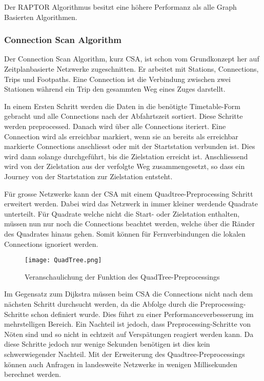 Der RAPTOR Algorithmus besitzt eine höhere Performanz als alle Graph Basierten Algorithmen. ~\cite{raptor}

\subsubsection{Connection Scan Algorithm}
\label{sec:Connection Scan Algorithm}
Der Connection Scan Algorithm, kurz CSA, ist schon vom Grundkonzept her auf Zeitplanbasierte Netzwerke zugeschnitten. Er arbeitet mit Stations, Connections, Trips und Footpaths. Eine Connection ist die Verbindung zwischen zwei Stationen während ein Trip den gesammten Weg eines Zuges darstellt. 

In einem Ersten Schritt werden die Daten in die benötigte Timetable-Form gebracht und alle Connections nach der Abfahrtszeit sortiert. Diese Schritte werden preprocessed. Danach wird über alle Connections iteriert. Eine Connection wird als erreichbar markiert, wenn sie an bereits als erreichbar markierte Connections anschliesst oder mit der Startstation verbunden ist. Dies wird dann solange durchgeführt, bis die Zielstation erreicht ist. Anschliessend wird von der Zielstation aus der verfolgte Weg zusammengesetzt, so dass ein Journey von der Startstation zur Zielstation entsteht. 

Für grosse Netzwerke kann der CSA mit einem Quadtree-Preprocessing Schritt erweitert werden. Dabei wird das Netzwerk in immer kleiner werdende Quadrate unterteilt. Für Quadrate welche nicht die Start- oder Zielstation enthalten, müssen nun nur noch die Connections beachtet werden, welche über die Ränder des Quadrates hinaus gehen. Somit können für Fernverbindungen die lokalen Connections ignoriert werden.
\begin{figure}[]
	\centering
	\texttt{[image: QuadTree.png]}
	\caption{Veranschaulichung der Funktion des QuadTree-Preprocessings ~\cite{csa}}
	\label{fig:QuadTree}
\end{figure}


Im Gegensatz zum Dijkstra müssen beim CSA die Connections nicht nach dem nächsten Schritt durchsucht werden, da die Abfolge durch die Preprocessing-Schritte schon definiert wurde. Dies führt zu einer Performanceverbesserung im mehrstelligen Bereich. Ein Nachteil ist jedoch, dass Preprocessing-Schritte von Nöten sind und so nicht in echtzeit auf Verspätungen reagiert werden kann. Da diese Schritte jedoch nur wenige Sekunden benötigen ist dies kein schwerwiegender Nachteil. Mit der Erweiterung des Quadtree-Preprocessings können auch Anfragen in landesweite Netzwerke in wenigen Millisekunden berechnet werden. 

